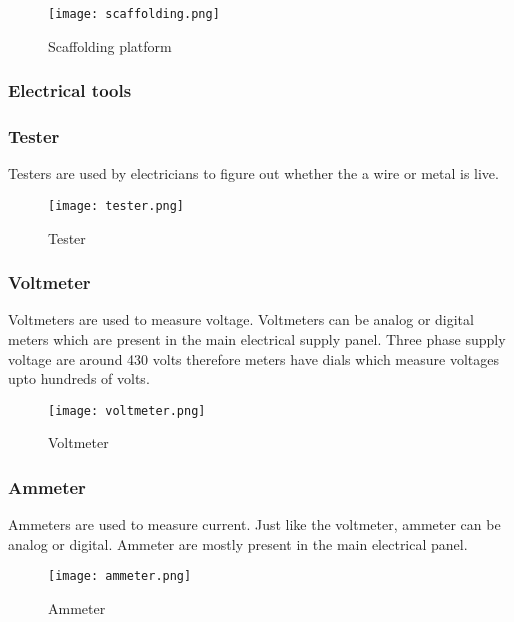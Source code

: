 \documentclass[a4paper,12pt]{article}
\begin{document}
						\begin{figure}[H]
							\centering				
							\texttt{[image: scaffolding.png]}
							\caption{Scaffolding platform}
							\label{fig:scaffolding-platform}
						\end{figure}
						
			\newpage
			\subsubsection{Electrical tools}
				\subsubsection*{Tester}
					Testers are used by electricians to figure out whether the a wire  or metal is live.					
						\begin{figure}[H]
							\centering				
							\texttt{[image: tester.png]}
							\caption{Tester}
							\label{fig:tester}
						\end{figure}
						
				\subsubsection*{Voltmeter}
					Voltmeters are used to measure voltage.
					Voltmeters can be analog or digital meters which are present in the main electrical supply panel.
					Three phase supply voltage are around 430 volts therefore meters have dials which measure voltages upto hundreds of volts. 
					
						\begin{figure}[H]
							\centering				
							\texttt{[image: voltmeter.png]}
							\caption{Voltmeter}
							\label{fig:voltmeter}
						\end{figure}
						
				\subsubsection*{Ammeter}
					Ammeters are used to measure current.
					Just like the voltmeter, ammeter can be analog or digital.
					Ammeter are mostly present in the main electrical panel.
						
								
						\begin{figure}[H]
							\centering				
							\texttt{[image: ammeter.png]}
							\caption{Ammeter}
							\label{fig:ammeter}
						\end{figure}
						
\end{document}
